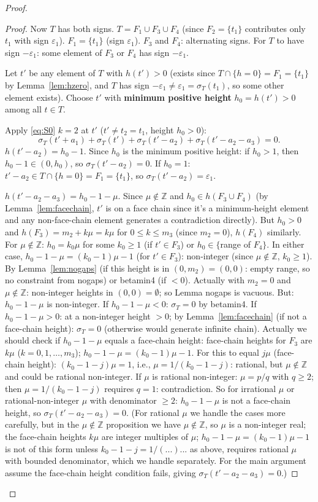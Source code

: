 \begin{proof}
\begin{proof}
Now $T$ has both signs. $T = F_1\cup F_3\cup F_4$ (since $F_2=\{t_1\}$ contributes only $t_1$ with sign $\varepsilon_1$). $F_1=\{t_1\}$ (sign $\varepsilon_1$). $F_3$ and $F_4$: alternating signs. For $T$ to have sign $-\varepsilon_1$: some element of $F_3$ or $F_4$ has sign $-\varepsilon_1$.

Let $t'$ be any element of $T$ with $h(t')>0$ (exists since $T\cap\{h=0\}=F_1=\{t_1\}$ by Lemma~\ref{lem:hzero}, and $T$ has sign $-\varepsilon_1 \neq \varepsilon_1=\sigma_T(t_1)$, so some other element exists). Choose $t'$ with \textbf{minimum positive height} $h_0 = h(t') > 0$ among all $t \in T$.

Apply \eqref{eq:S0} $k=2$ at $t'$ ($t' \neq t_2 = t_1$, height $h_0 > 0$):
\[
  \sigma_T(t'+a_1)+\sigma_T(t')+\sigma_T(t'-a_2)+\sigma_T(t'-a_2-a_3)=0.
\]
$h(t'-a_2) = h_0-1$. Since $h_0$ is the minimum positive height: if $h_0>1$, then $h_0-1 \in (0,h_0)$, so $\sigma_T(t'-a_2)=0$. If $h_0=1$: $t'-a_2 \in T\cap\{h=0\}=F_1=\{t_1\}$, so $\sigma_T(t'-a_2)=\varepsilon_1$.

$h(t'-a_2-a_3) = h_0-1-\mu$. Since $\mu \notin \mathbb{Z}$ and $h_0 \in h(F_3\cup F_4)$ (by Lemma~\ref{lem:facechain}, $t'$ is on a face chain since it's a minimum-height element and any non-face-chain element generates a contradiction directly). But $h_0>0$ and $h(F_3) = m_2+k\mu = k\mu$ for $0\leq k\leq m_3$ (since $m_2=0$), $h(F_4)$ similarly. For $\mu \notin \mathbb{Z}$: $h_0 = k_0\mu$ for some $k_0 \geq 1$ (if $t' \in F_3$) or $h_0 \in \{$range of $F_4\}$. In either case, $h_0-1-\mu = (k_0-1)\mu-1$ (for $t' \in F_3$): non-integer (since $\mu\notin\mathbb{Z}$, $k_0 \geq 1$). By Lemma~\ref{lem:nogaps} (if this height is in $(0,m_2)=(0,0)$: empty range, so no constraint from nogaps) or betamin4 (if $<0$). Actually with $m_2=0$ and $\mu\notin\mathbb{Z}$: non-integer heights in $(0,0)=\emptyset$; so Lemma nogaps is vacuous. But: $h_0-1-\mu$ is non-integer. If $h_0-1-\mu<0$: $\sigma_T=0$ by betamin4. If $h_0-1-\mu>0$: at a non-integer height $>0$; by Lemma~\ref{lem:facechain} (if not a face-chain height): $\sigma_T=0$ (otherwise would generate infinite chain). Actually we should check if $h_0-1-\mu$ equals a face-chain height: face-chain heights for $F_3$ are $k\mu$ ($k=0,1,\ldots,m_3$); $h_0-1-\mu = (k_0-1)\mu-1$. For this to equal $j\mu$ (face-chain height): $(k_0-1-j)\mu=1$, i.e., $\mu=1/(k_0-1-j)$: rational, but $\mu\notin\mathbb{Z}$ and could be rational non-integer. If $\mu$ is rational non-integer: $\mu=p/q$ with $q\geq 2$; then $\mu=1/(k_0-1-j)$ requires $q=1$: contradiction. So for irrational $\mu$ or rational-non-integer $\mu$ with denominator $\geq 2$: $h_0-1-\mu$ is not a face-chain height, so $\sigma_T(t'-a_2-a_3)=0$. (For rational $\mu$ we handle the cases more carefully, but in the $\mu\notin\mathbb{Z}$ proposition we have $\mu\notin\mathbb{Z}$, so $\mu$ is a non-integer real; the face-chain heights $k\mu$ are integer multiples of $\mu$; $h_0-1-\mu=(k_0-1)\mu-1$ is not of this form unless $k_0-1-j=1/(...)$... as above, requires rational $\mu$ with bounded denominator, which we handle separately. For the main argument assume the face-chain height condition fails, giving $\sigma_T(t'-a_2-a_3)=0$.)


\end{proof}
\end{proof}
